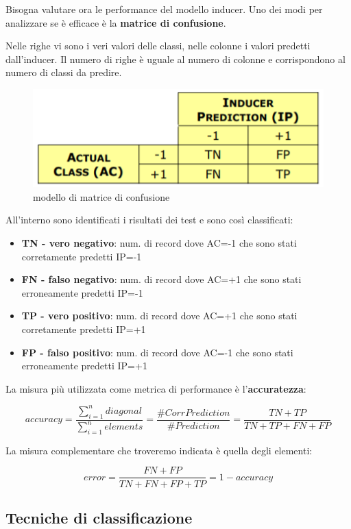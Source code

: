 Bisogna valutare ora le performance del modello inducer. Uno dei modi per analizzare se è efficace è la \textbf{matrice di confusione}. 

Nelle righe vi sono i veri valori delle classi, nelle colonne i valori predetti dall'inducer. Il numero di righe è uguale al numero di colonne e corrispondono al numero di classi da predire.

\begin{figure}[H]
	\centering
	\includegraphics[height=0.25 \linewidth]{classification/pict/matrconf.png}
	\caption{modello di matrice di confusione}
\end{figure}
All'interno sono identificati i risultati dei test e sono così classificati:
\begin{itemize}
	\item \textbf{TN - vero negativo}: num. di record dove AC=-1  che sono stati corretamente predetti IP=-1
	\item \textbf{FN - falso negativo}: num. di record dove AC=+1  che sono stati erroneamente predetti IP=-1
	\item \textbf{TP - vero positivo}: num. di record dove AC=+1  che sono stati corretamente predetti IP=+1
	\item \textbf{FP - falso positivo}: num. di record dove AC=-1  che sono stati erroneamente predetti IP=+1
\end{itemize}

\begin{defn}
	La misura più utilizzata come metrica di performance è l'\textbf{accuratezza}:
	
	\[accuracy = \frac{\sum_{i = 1}^{n} diagonal}{\sum_{i=1}^{n}elements} = \frac{\#CorrPrediction}{\#Prediction} = \frac{TN + TP}{TN + TP + FN + FP}\] 
	
	La misura complementare che troveremo indicata è quella degli elementi:
	
	\[error = \frac{FN + FP}{TN + FN + FP + TP} =  1 - accuracy\]
\end{defn}

\subsection{Tecniche di classificazione}

